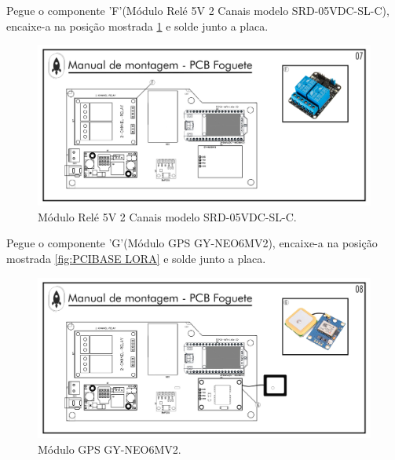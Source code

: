 \par Pegue o componente 'F'(Módulo Relé 5V 2 Canais modelo SRD-05VDC-SL-C), encaixe-a na posição mostrada \ref{fig:PCIFoguete Relé} e solde junto  a placa.
\begin{figure}[H]
  \centering
  \includegraphics[width=\textwidth]{Figuras/FOGUETE/Pg-07---PL-02.png}
  \caption{Módulo Relé 5V 2 Canais modelo SRD-05VDC-SL-C.}
  \label{fig:PCIFoguete Relé}
\end{figure}

\newpage

\par Pegue o componente 'G'(Módulo GPS GY-NEO6MV2), encaixe-a na posição mostrada \ref{fig:PCIBASE LORA} e solde junto a placa.
\begin{figure}[H]
  \centering
  \includegraphics[width=\textwidth]{Figuras/FOGUETE/Pg-08---PL-02.png}
  \caption{Módulo GPS GY-NEO6MV2.}
  \label{fig:PCIFoguete LORA}
\end{figure}


